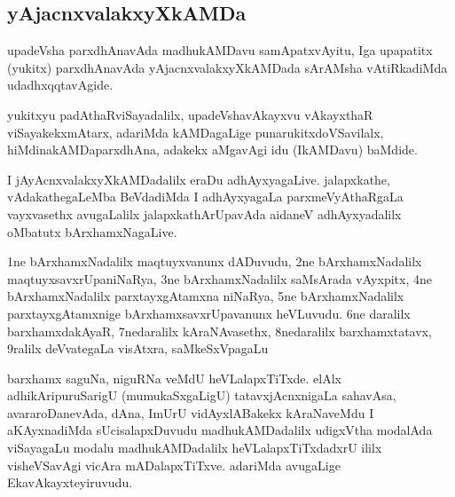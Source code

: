 \begin{center}
\section*{yAjacnxvalakxyXkAMDa}
\end{center}
\centerline{}

\begin{artha}
upadeVsha parxdhAnavAda madhukAMDavu samApatxvAyitu, Iga upa\-patitx (yukitx) parxdhAnavAda 
yAjacnxvalakxyXkAMDada sArAMsha vAtiRkadiMda udadhxqqtavAgide.

yukitxyu padAthaRviSayadalilx, upadeVshavAkayxvu vAkayxthaR viSayakekx\-mAtarx, adariMda 
kAMDagaLige punarukitxdoVSavilalx, hiMdinakAMDaparxdhAna, adakekx aMgavAgi idu 
(IkAMDavu) baMdide.  
\end{artha}

\centerline{}

I jAyAcnxvalakxyXkAMDadalilx eraDu adhAyxyagaLive. jalapxkathe, vAdakathegaLeMba BeVdadiMda 
I adhAyxyagaLa parxmeVyAthaRgaLa vayxvasethx avugaLalilx jalapxkathA\-rUpavAda aidaneV 
adhAyxyadalilx oMbatutx bArxhamxNagaLive.

\centerline{}

\begin{artha}
1ne bArxhamxNadalilx maqtuyxvanunx dADuvudu, 2ne bArxhamxNadalilx maqtuyxsavxrUpa\-niNaRya, 3ne bArxhamxNadalilx saMsArada vAyxpitx, 4ne bArxhamxNadalilx parxtayxgAtamxna \-niNaRya, 5ne bArxhamxNadalilx parxtayxgAtamxnige bArxhamxsavxrUpavanunx heVLuvudu. 6ne daralilx barxhamxda\-kAyaR, 7nedaralilx kAraNAvasethx, 8nedaralilx barxhamxtatavx, 9ralilx deVvategaLa visAtxra, saMkeSxVpagaLu 

barxhamx saguNa, niguRNa veMdU heVLalapxTiTxde. elAlx adhikAri\-puruSarigU (mumukaSxgaLigU) tatavxjAcnxnigaLa sahavAsa, avararoDanevAda, dAna, ImUrU vidAyxlABakekx kAraNaveMdu I aKAyxnadiMda sUcisalapxDuvudu madhukAMDadalilx udigxVtha modalAda viSayagaLu modalu madhukAMDadalilx heVLalapxTiTxdadxrU ililx visheVSavAgi vicAra mADalapxTiTxve. adariMda avugaLige EkavAkayxteyiruvudu.
\end{artha}

